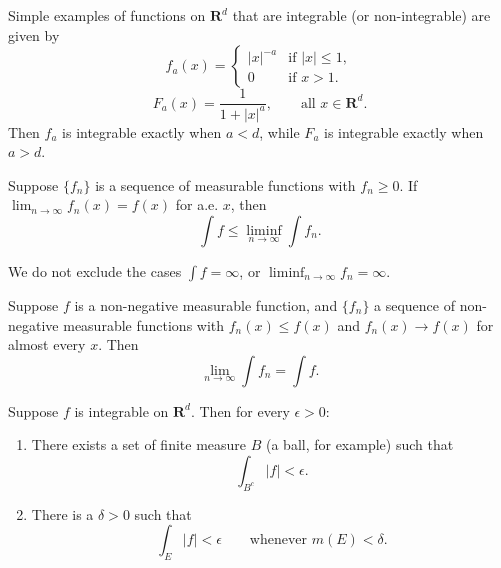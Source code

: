 \begin{example}
  Simple examples of functions on $\mathbf{R}^d$ that are integrable
  (or non-integrable) are given by
  \begin{equation}
  f_a(x) =
  \begin{cases}
  |x|^{-a} & \text{if } |x| \leq 1,\\
  0 & \text{if } x > 1.
  \end{cases}
  \end{equation}
  \begin{equation}
  F_a(x) = \frac{1}{1 + |x|^a}, \qquad \text{all } x \in \mathbf{R}^d.
  \end{equation}
  Then $f_a$ is integrable exactly when $a < d$, while $F_a$ is integrable
  exactly when $a > d$.
\end{example}

\begin{lemma}[Fatou]
  Suppose $\{f_n\}$ is a sequence of measurable functions with $f_n \geq 0$.
  If $\lim_{n \to \infty} f_n(x) = f(x)$ for a.e. $x$, then
  \begin{equation}
  \int f \leq \liminf_{n \to \infty} \int f_n.
  \end{equation}
\end{lemma}

\begin{remark}
  We do not exclude the cases $\int f = \infty$,
  or $\liminf_{n \to \infty} f_n = \infty$.
\end{remark}

\begin{corollary}
  Suppose $f$ is a non-negative measurable function, and $\{f_n\}$ a sequence
  of non-negative measurable functions with
  $f_n(x) \leq f(x)$ and $f_n(x) \to f(x)$ for almost every $x$. Then
  \begin{equation}
  \lim_{n \to \infty} \int f_n = \int f.
  \end{equation}
\end{corollary}

\begin{proposition}
  Suppose $f$ is integrable on $\mathbf{R}^d$. Then for every $\epsilon > 0$:
  \begin{enumerate}
    \renewcommand{\theenumi}{\roman{enumi}}
    \item There exists a set of finite measure $B$ (a ball, for example) such that
    \begin{equation}
    \int_{B^c} |f| < \epsilon.
    \end{equation}
    \item There is a $\delta > 0$ such that
    \begin{equation}
    \int_E |f| < \epsilon \qquad \text{whenever } m(E) < \delta.
    \end{equation}
  \end{enumerate}
\end{proposition}

